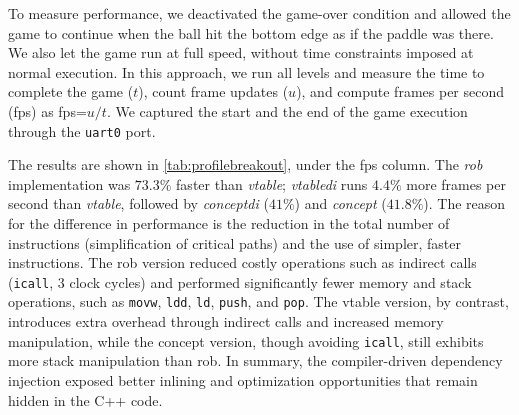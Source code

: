 \documentclass[10pt,sigplan,screen,anonymous]{acmart}
\newcommand{\blindreview}[1]{{\color{teal}{<omitted for blind review>}}}
\begin{document}

To measure performance, we deactivated the game-over condition and allowed the game to continue when the ball hit the bottom edge as if the paddle was there. We also let the game run at full speed, without time constraints imposed at normal execution. In this approach, we run all levels and measure the time to complete the game ($t$), count frame updates ($u$), and compute frames per second (fps) as fps=$u/t$. We captured the start and the end of the game execution through the {\tt uart0} port. 



The results are shown in \autoref{tab:profilebreakout}, under the fps column. The \emph{rob} implementation was $73.3\%$ faster than \emph{vtable}; \emph{vtabledi} runs $4.4\%$ more frames per second than \emph{vtable}, followed by \emph{conceptdi} ($41\%$) and \emph{concept} ($41.8\%$). The reason for the difference in performance is the reduction in the total number of instructions (simplification of critical paths) and the use of simpler, faster instructions. The rob version reduced costly operations such as indirect calls ({\tt icall}, 3 clock cycles) and performed significantly fewer memory and stack operations, such as {\tt movw}, {\tt ldd}, {\tt ld}, {\tt push}, and {\tt pop}. The vtable version, by contrast, introduces extra overhead through indirect calls and increased memory manipulation, while the concept version, though avoiding {\tt icall}, still exhibits more stack manipulation than rob. In summary, the compiler-driven dependency injection exposed better inlining and optimization opportunities that remain hidden in the C++ code.
\end{document}
